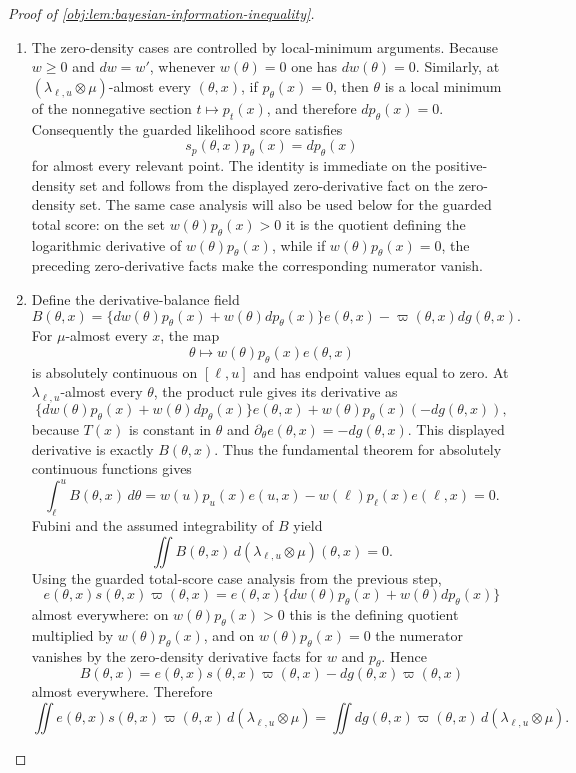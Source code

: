 \begin{proof}[Proof of \cref{obj:lem:bayesian-information-inequality}]
\begin{enumerate}
\item The zero-density cases are controlled by local-minimum arguments.  Because \(w\ge0\)
and \(dw=w'\), whenever \(w(\theta)=0\) one has \(dw(\theta)=0\).  Similarly, at
\((\lambda_{\ell,u}\otimes\mu)\)-almost every \((\theta,x)\), if
\(p_\theta(x)=0\), then \(\theta\) is a local minimum of the nonnegative section
\(t\mapsto p_t(x)\), and therefore \(dp_\theta(x)=0\).  Consequently the guarded
likelihood score satisfies
\[
s_p(\theta,x)p_\theta(x)=dp_\theta(x)
\]
for almost every relevant point.  The identity is immediate on the positive-density set
and follows from the displayed zero-derivative fact on the zero-density set.  The same
case analysis will also be used below for the guarded total score: on the set
\(w(\theta)p_\theta(x)>0\) it is the quotient defining the logarithmic derivative of
\(w(\theta)p_\theta(x)\), while if \(w(\theta)p_\theta(x)=0\), the preceding
zero-derivative facts make the corresponding numerator vanish. %

\item Define the derivative-balance field
\[
B(\theta,x)
 =
\{dw(\theta)p_\theta(x)+w(\theta)dp_\theta(x)\}e(\theta,x)
 -
\varpi(\theta,x)dg(\theta,x).
\]
For \(\mu\)-almost every \(x\), the map
\[
\theta\longmapsto w(\theta)p_\theta(x)e(\theta,x)
\]
is absolutely continuous on \([\ell,u]\) and has endpoint values equal to zero.  At
\(\lambda_{\ell,u}\)-almost every \(\theta\), the product rule gives its derivative as
\[
\{dw(\theta)p_\theta(x)+w(\theta)dp_\theta(x)\}e(\theta,x)
+w(\theta)p_\theta(x)(-dg(\theta,x)),
\]
because \(T(x)\) is constant in \(\theta\) and \(\partial_\theta e(\theta,x)=-dg(\theta,x)\).
This displayed derivative is exactly \(B(\theta,x)\).  Thus the fundamental theorem for
absolutely continuous functions gives
\[
\int_\ell^u B(\theta,x)\,d\theta
 =
w(u)p_u(x)e(u,x)-w(\ell)p_\ell(x)e(\ell,x)
 =
0.
\]
Fubini and the assumed integrability of \(B\) yield
\[
\iint B(\theta,x)\,d(\lambda_{\ell,u}\otimes\mu)(\theta,x)=0.
\]
Using the guarded total-score case analysis from the previous step,
\[
e(\theta,x)s(\theta,x)\varpi(\theta,x)
 =
e(\theta,x)\{dw(\theta)p_\theta(x)+w(\theta)dp_\theta(x)\}
\]
almost everywhere: on \(w(\theta)p_\theta(x)>0\) this is the defining quotient
multiplied by \(w(\theta)p_\theta(x)\), and on \(w(\theta)p_\theta(x)=0\) the numerator
vanishes by the zero-density derivative facts for \(w\) and \(p_\theta\).  Hence
\[
B(\theta,x)
 =
e(\theta,x)s(\theta,x)\varpi(\theta,x)-dg(\theta,x)\varpi(\theta,x)
\]
almost everywhere.  Therefore
\[
\iint e(\theta,x)s(\theta,x)\varpi(\theta,x)\,d(\lambda_{\ell,u}\otimes\mu)
 =
\iint dg(\theta,x)\varpi(\theta,x)\,d(\lambda_{\ell,u}\otimes\mu).
\] %


\end{enumerate}
\end{proof}
